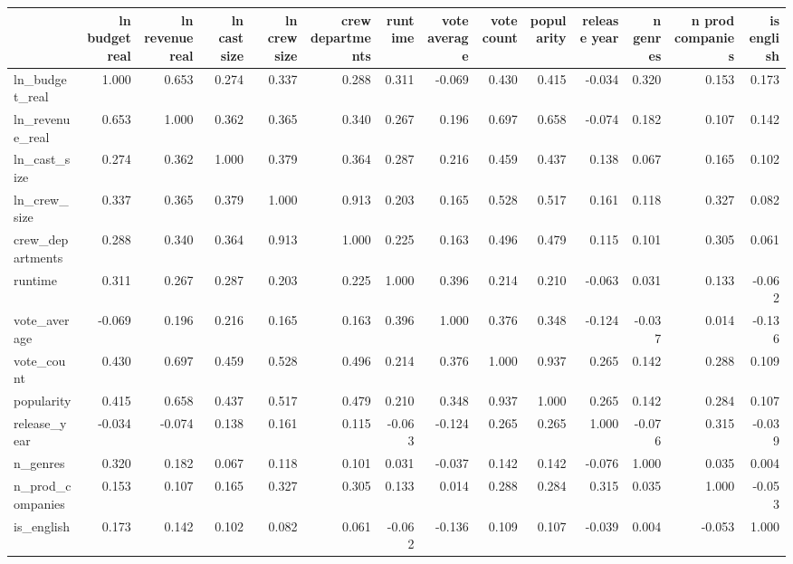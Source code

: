 \begin{tabular}{lrrrrrrrrrrrrr}
\toprule
 & ln budget real & ln revenue real & ln cast size & ln crew size & crew departments & runtime & vote average & vote count & popularity & release year & n genres & n prod companies & is english \\
\midrule
ln\_budget\_real & 1.000 & 0.653 & 0.274 & 0.337 & 0.288 & 0.311 & -0.069 & 0.430 & 0.415 & -0.034 & 0.320 & 0.153 & 0.173 \\
ln\_revenue\_real & 0.653 & 1.000 & 0.362 & 0.365 & 0.340 & 0.267 & 0.196 & 0.697 & 0.658 & -0.074 & 0.182 & 0.107 & 0.142 \\
ln\_cast\_size & 0.274 & 0.362 & 1.000 & 0.379 & 0.364 & 0.287 & 0.216 & 0.459 & 0.437 & 0.138 & 0.067 & 0.165 & 0.102 \\
ln\_crew\_size & 0.337 & 0.365 & 0.379 & 1.000 & 0.913 & 0.203 & 0.165 & 0.528 & 0.517 & 0.161 & 0.118 & 0.327 & 0.082 \\
crew\_departments & 0.288 & 0.340 & 0.364 & 0.913 & 1.000 & 0.225 & 0.163 & 0.496 & 0.479 & 0.115 & 0.101 & 0.305 & 0.061 \\
runtime & 0.311 & 0.267 & 0.287 & 0.203 & 0.225 & 1.000 & 0.396 & 0.214 & 0.210 & -0.063 & 0.031 & 0.133 & -0.062 \\
vote\_average & -0.069 & 0.196 & 0.216 & 0.165 & 0.163 & 0.396 & 1.000 & 0.376 & 0.348 & -0.124 & -0.037 & 0.014 & -0.136 \\
vote\_count & 0.430 & 0.697 & 0.459 & 0.528 & 0.496 & 0.214 & 0.376 & 1.000 & 0.937 & 0.265 & 0.142 & 0.288 & 0.109 \\
popularity & 0.415 & 0.658 & 0.437 & 0.517 & 0.479 & 0.210 & 0.348 & 0.937 & 1.000 & 0.265 & 0.142 & 0.284 & 0.107 \\
release\_year & -0.034 & -0.074 & 0.138 & 0.161 & 0.115 & -0.063 & -0.124 & 0.265 & 0.265 & 1.000 & -0.076 & 0.315 & -0.039 \\
n\_genres & 0.320 & 0.182 & 0.067 & 0.118 & 0.101 & 0.031 & -0.037 & 0.142 & 0.142 & -0.076 & 1.000 & 0.035 & 0.004 \\
n\_prod\_companies & 0.153 & 0.107 & 0.165 & 0.327 & 0.305 & 0.133 & 0.014 & 0.288 & 0.284 & 0.315 & 0.035 & 1.000 & -0.053 \\
is\_english & 0.173 & 0.142 & 0.102 & 0.082 & 0.061 & -0.062 & -0.136 & 0.109 & 0.107 & -0.039 & 0.004 & -0.053 & 1.000 \\
\bottomrule
\end{tabular}